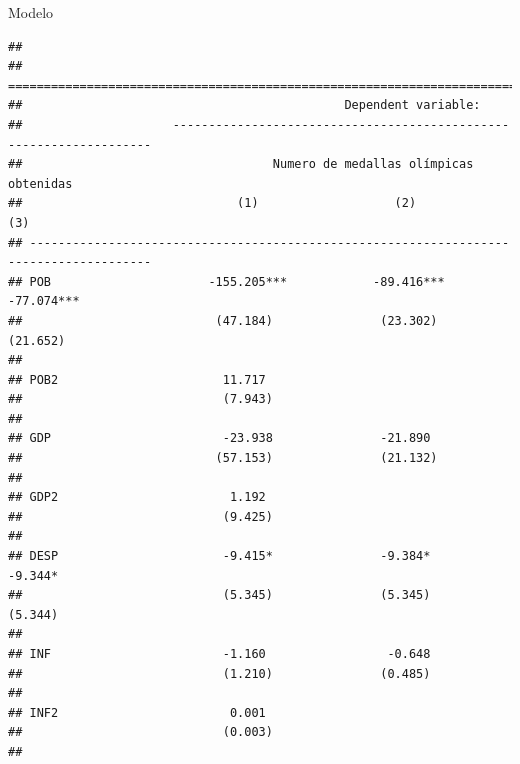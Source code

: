 \documentclass[
  ignorenonframetext,
]{beamer}
\begin{document}
\begin{frame}[fragile]{Modelo}
\protect\hypertarget{modelo}{}
\begin{verbatim}
## 
## =======================================================================================
##                                             Dependent variable:                        
##                     -------------------------------------------------------------------
##                                   Numero de medallas olímpicas obtenidas               
##                              (1)                   (2)                    (3)          
## ---------------------------------------------------------------------------------------
## POB                      -155.205***            -89.416***             -77.074***      
##                           (47.184)               (23.302)               (21.652)       
##                                                                                        
## POB2                       11.717                                                      
##                            (7.943)                                                     
##                                                                                        
## GDP                        -23.938               -21.890                               
##                           (57.153)               (21.132)                              
##                                                                                        
## GDP2                        1.192                                                      
##                            (9.425)                                                     
##                                                                                        
## DESP                       -9.415*               -9.384*                -9.344*        
##                            (5.345)               (5.345)                (5.344)        
##                                                                                        
## INF                        -1.160                 -0.648                               
##                            (1.210)               (0.485)                               
##                                                                                        
## INF2                        0.001                                                      
##                            (0.003)                                                     
##                                                                                        

\end{verbatim}
\end{frame}
\end{document}
